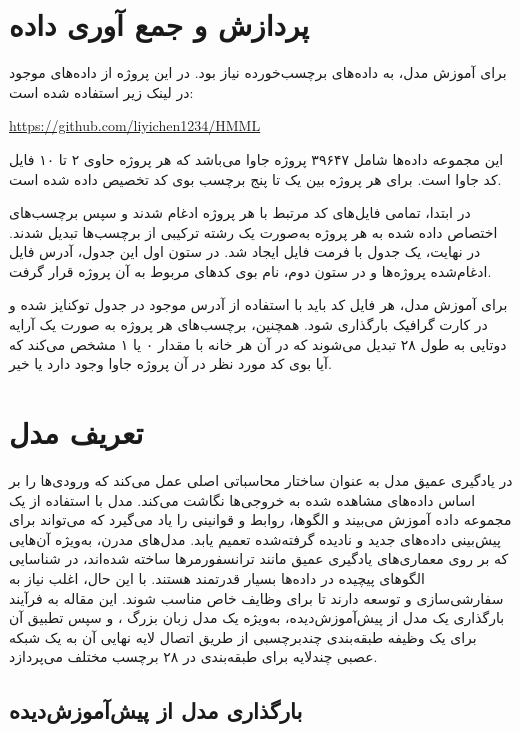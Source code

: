 \section{پردازش و جمع آوری داده}
برای آموزش مدل، به داده‌های برچسب‌خورده نیاز بود. در این پروژه از داده‌های موجود در لینک زیر استفاده شده است:
\begin{latin}
\url{https://github.com/liyichen1234/HMML}
\end{latin}
این مجموعه داده‌ها شامل ۳۹۶۴۷ پروژه جاوا می‌باشد که هر پروژه حاوی ۲ تا ۱۰ فایل کد جاوا است. برای هر پروژه بین یک تا پنج برچسب بوی کد تخصیص داده شده است.

در ابتدا، تمامی فایل‌های کد مرتبط با هر پروژه ادغام شدند و سپس برچسب‌های اختصاص داده شده به هر پروژه به‌صورت یک رشته ترکیبی از برچسب‌ها تبدیل شدند. در نهایت، یک جدول با فرمت فایل  ایجاد شد. در ستون اول این جدول، آدرس فایل ادغام‌شده پروژه‌ها و در ستون دوم، نام بوی کدهای مربوط به آن پروژه قرار گرفت.

برای آموزش مدل، هر فایل کد باید با استفاده از آدرس موجود در جدول توکنایز شده و در کارت گرافیک بارگذاری شود. همچنین، برچسب‌های هر پروژه به صورت یک آرایه دوتایی به طول ۲۸ تبدیل می‌شوند که در آن هر خانه با مقدار ۰ یا ۱ مشخص می‌کند که آیا بوی کد مورد نظر در آن پروژه جاوا وجود دارد یا خیر.\cite{BOGATINOVSKI2022117215}
\section{تعریف مدل}
در یادگیری عمیق مدل به عنوان ساختار محاسباتی اصلی عمل می‌کند که ورودی‌ها را بر اساس داده‌های مشاهده شده به خروجی‌ها نگاشت می‌کند. مدل با استفاده از یک مجموعه داده آموزش می‌بیند و الگوها، روابط و قوانینی را یاد می‌گیرد که می‌تواند برای پیش‌بینی داده‌های جدید و نادیده گرفته‌شده تعمیم یابد. مدل‌های مدرن، به‌ویژه آن‌هایی که بر روی معماری‌های یادگیری عمیق مانند ترانسفورمرها ساخته شده‌اند، در شناسایی الگوهای پیچیده در داده‌ها بسیار قدرتمند هستند. با این حال، اغلب نیاز به سفارشی‌سازی و توسعه دارند تا برای وظایف خاص مناسب شوند. این مقاله به فرآیند بارگذاری یک مدل از پیش‌آموزش‌دیده، به‌ویژه یک مدل زبان بزرگ ، و سپس تطبیق آن برای یک وظیفه طبقه‌بندی چند‌برچسبی از طریق اتصال لایه نهایی آن به یک شبکه عصبی چندلایه  برای طبقه‌بندی در ۲۸ برچسب مختلف می‌پردازد.\cite{Zhang2022code}
\subsection{بارگذاری مدل از پیش‌آموزش‌دیده}

